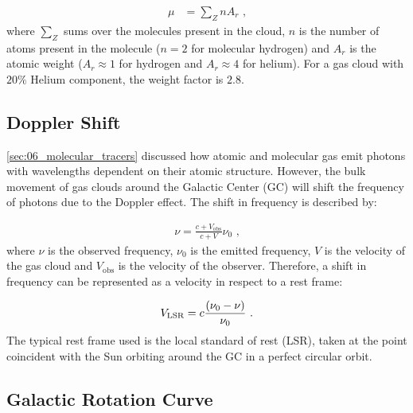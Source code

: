 \begin{equation}
    \begin{aligned}
        \mu&=\sum_Z n A_r\text{ ,}
    \end{aligned}
\end{equation}
\noindent where $\sum_Z$ sums over the molecules present in the cloud, $n$ is the number of atoms present in the molecule ($n=2$ for molecular hydrogen) and $A_r$ is the atomic weight ($A_r\approx1$ for hydrogen and $A_r\approx 4$ for helium). For a gas cloud with $20\%$ Helium component, the weight factor is $2.8$.

\subsection{Doppler Shift}

\autoref{sec:06_molecular_tracers} discussed how atomic and molecular gas emit photons with wavelengths dependent on their atomic structure. However, the bulk movement of gas clouds around the Galactic Center (GC) will shift the frequency of photons due to the Doppler effect. The shift in frequency is described by:

\begin{equation}
    \begin{aligned}
        \nu = \frac{c+V_\text{obs}}{c+V}\nu_0\text{ ,}
    \end{aligned}
\end{equation}
\noindent where $\nu$ is the observed frequency, $\nu_0$ is the emitted frequency, $V$ is the velocity of the gas cloud and $V_\text{obs}$ is the velocity of the observer. Therefore, a shift in frequency can be represented as a velocity in respect to a rest frame:

\begin{equation}
    \begin{aligned}
        V_\text{LSR}=c\frac{\qty(\nu_0-\nu)}{\nu_0}\text{ .}
    \end{aligned}
\end{equation}
\noindent The typical rest frame used is the local standard of rest (LSR), taken at the point coincident with the Sun orbiting around the GC in a perfect circular orbit.

\subsection{Galactic Rotation Curve} \label{sec:06_galactic_rotation}

